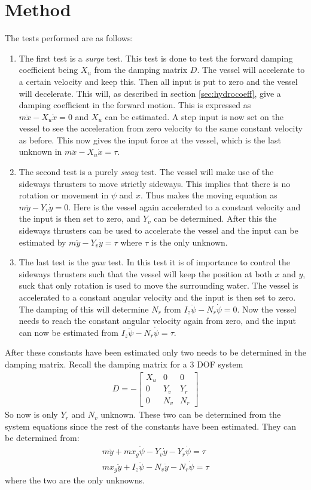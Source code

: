 \section{Method}
The tests performed are as follows:
\begin{enumerate}
	\item The first test is a \textit{surge} test. This test is done to test the forward damping coefficient being $X_u$ from the damping matrix $D$. The vessel will accelerate to a certain velocity and keep this. Then all input is put to zero and the vessel will decelerate. This will, as described in section \ref{sec:hydrocoeff}, give a damping coefficient in the forward motion. This is expressed as $m \ddot x - X_u \dot x = 0$ and $X_u$ can be estimated. A step input is now set on the vessel to see the acceleration from zero velocity to the same constant velocity as before. This now gives the input force at the vessel, which is the last unknown in $m \ddot x - X_u \dot x = \tau$.
\item The second test is a purely \textit{sway} test. The vessel will make use of the sideways thrusters to move strictly sideways. This implies that there is no rotation or movement in $\psi$ and $x$. Thus makes the moving equation as $m \ddot y - Y_v \dot y = 0$. Here is the vessel again accelerated to a constant velocity and the input is then set to zero, and $Y_v$ can be determined. After this the sideways thrusters can be used to accelerate the vessel and the input can be estimated by $m \ddot y - Y_v \dot y = \tau$ where $\tau$ is the only unknown.
	\item The last test is the \textit{yaw} test. In this test it is of importance to control the sideways thrusters such that the vessel will keep the position at both $x$ and $y$, suck that only rotation is used to move the surrounding water. The vessel is accelerated to a constant angular velocity and the input is then set to zero. The damping of this will determine $N_r$ from $I_z\ddot \psi - N_r \dot \psi = 0$. Now the vessel needs to reach the constant angular velocity again from zero, and the input can now be estimated from $I_z\ddot \psi - N_r \dot \psi = \tau$.
\end{enumerate}
After these constants have been estimated only two needs to be determined in the damping matrix. Recall the damping matrix for a 3 \ac{DOF} system
\begin{align}
D = -
\begin{bmatrix}
X_u & 0 & 0\\
0 & Y_v & Y_r\\
0 & N_v & N_r
\end{bmatrix}
\end{align}
So now is only $Y_r$ and $N_v$ unknown. These two can be determined from the system equations since the rest of the constants have been estimated. They can be determined from:
\begin{align}
m \ddot y + mx_g\ddot\psi - Y_v \dot y - Y_r \dot \psi = \tau\\
mx_g \ddot y + I_z\ddot \psi - N_v \dot y - N_r \dot \psi = \tau
\end{align}
where the two are the only unknowns.


